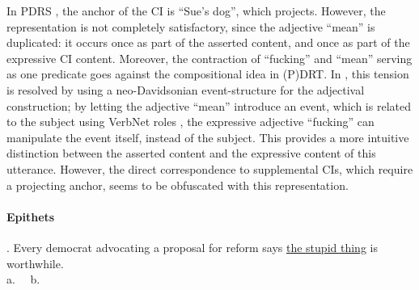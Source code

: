 \noindent In PDRS \Last[a], the anchor of the CI is ``Sue's dog'', which
projects.  However, the representation is not completely satisfactory, since
the adjective ``mean'' is duplicated: it occurs once as part of the asserted
content, and once as part of the expressive CI content. Moreover, the
contraction of ``fucking'' and ``mean'' serving as one predicate goes
against the compositional idea in (P)DRT. In \Last[b], this tension is
resolved by using a neo-Davidsonian event-structure for the adjectival
construction; by letting the adjective ``mean'' introduce an event, which is
related to the subject using VerbNet roles \citep{kipper2008large}, the
expressive adjective ``fucking'' can manipulate the event itself, instead of
the subject. This provides a more intuitive distinction between the asserted
content and the expressive content of this utterance. However, the direct
correspondence to supplemental CIs, which require a projecting anchor, seems
to be obfuscated with this representation.

\noindent\parbox[b]{\textwidth}{\paragraph{Epithets}
\ex. Every democrat advocating a proposal for reform says 
  \underline{the stupid thing} is worthwhile.\\
a.~~
b.~~

}

